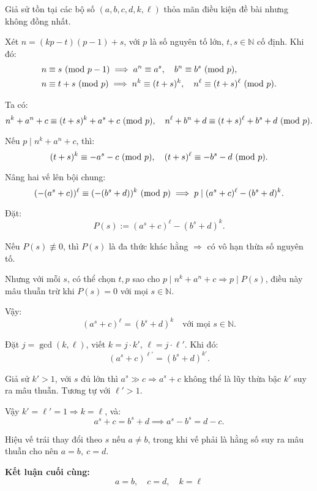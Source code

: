 \documentclass[../05-modular-arithmetic-a.tex]{subfiles}
\begin{document}
\begin{soln}\footnotemark
	Giả sử tồn tại các bộ số \( (a, b, c, d, k, \ell) \) thỏa mãn điều kiện đề bài nhưng không đồng nhất.

	Xét \( n = (kp - t)(p - 1) + s \), với \( p \) là số nguyên tố lớn, \( t, s \in \mathbb{N} \) cố định. Khi đó:
	\[
		\begin{aligned}
			n &\equiv s \ (\mathrm{mod}\ p - 1) \implies a^n \equiv a^s,\quad b^n \equiv b^s \ (\mathrm{mod}\ p), \\
			n &\equiv t + s \ (\mathrm{mod}\ p) \implies n^k \equiv (t + s)^k,\quad n^\ell \equiv (t + s)^\ell \ (\mathrm{mod}\ p).
		\end{aligned}
	\]

	Ta có:
	\[
		n^k + a^n + c \equiv (t + s)^k + a^s + c \ (\mathrm{mod}\ p),\quad
		n^\ell + b^n + d \equiv (t + s)^\ell + b^s + d \ (\mathrm{mod}\ p).
	\]

	Nếu \( p \mid n^k + a^n + c \), thì:
	\[
		(t + s)^k \equiv -a^s - c \ (\mathrm{mod}\ p),\quad (t + s)^\ell \equiv -b^s - d \ (\mathrm{mod}\ p).
	\]

	Nâng hai vế lên bội chung:
	\[
		(-(a^s + c))^\ell \equiv (-(b^s + d))^k \ (\mathrm{mod}\ p) \implies p \mid (a^s + c)^\ell - (b^s + d)^k.
	\]

	Đặt:
	\[
	P(s) := (a^s + c)^\ell - (b^s + d)^k.
	\]

	Nếu \( P(s) \not\equiv 0 \), thì \( P(s) \) là đa thức khác hằng \( \Rightarrow \) có vô hạn thừa số nguyên tố.

	Nhưng với mỗi \( s \), có thể chọn \( t, p \) sao cho \( p \mid n^k + a^n + c \Rightarrow p \mid P(s) \), điều này mâu thuẫn trừ khi \( P(s) = 0 \) với mọi \( s \in \mathbb{N} \).

	Vậy:
	\[
		(a^s + c)^\ell = (b^s + d)^k\quad \text{với mọi } s \in \mathbb{N}.
	\]

	Đặt \( j = \gcd(k, \ell) \), viết \( k = j \cdot k' \), \( \ell = j \cdot \ell' \). Khi đó:
	\[
		(a^s + c)^{\ell'} = (b^s + d)^{k'}.
	\]

	Giả sử \( k' > 1 \), với \( s \) đủ lớn thì \( a^s \gg c \Rightarrow a^s + c \) không thể là lũy thừa bậc \( k' \) suy ra mâu thuẫn. Tương tự với \( \ell' > 1 \).

	Vậy \( k' = \ell' = 1 \Rightarrow k = \ell \), và:
	\[
		a^s + c = b^s + d \implies a^s - b^s = d - c.
	\]

	Hiệu vế trái thay đổi theo \( s \) nếu \( a \ne b \), trong khi vế phải là hằng số suy ra mâu thuẫn cho nên \( a = b,\ c = d \).

	\textbf{Kết luận cuối cùng:}
	\[
		\boxed{a = b, \quad c = d, \quad k = \ell}
	\]
\end{soln}

\end{document}

